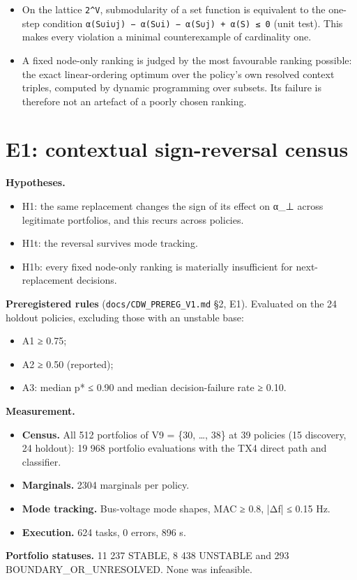 \documentclass[10pt,a4paper]{article}
\begin{document}
\begin{itemize}
\item On the lattice \texttt{2\textasciicircum{}V}, submodularity of a set function is equivalent to the one-step condition \texttt{α(S∪i∪j) − α(S∪i) − α(S∪j) + α(S) ≤ 0} (unit test). This makes every violation a minimal counterexample of cardinality one.
\item A fixed node-only ranking is judged by the most favourable ranking possible: the exact linear-ordering optimum over the policy's own resolved context triples, computed by dynamic programming over subsets. Its failure is therefore not an artefact of a poorly chosen ranking.
\end{itemize}
\section{E1: contextual sign-reversal census}
\textbf{Hypotheses.}

\begin{itemize}
\item H1: the same replacement changes the sign of its effect on α\_⊥ across legitimate portfolios, and this recurs across policies.
\item H1t: the reversal survives mode tracking.
\item H1b: every fixed node-only ranking is materially insufficient for next-replacement decisions.
\end{itemize}
\textbf{Preregistered rules} (\texttt{docs/\allowbreak{}CDW\_\allowbreak{}PREREG\_\allowbreak{}V1.md} §2, E1). Evaluated on the 24 holdout policies, excluding those with an unstable base:

\begin{itemize}
\item A1 ≥ 0.75;
\item A2 ≥ 0.50 (reported);
\item A3: median p* ≤ 0.90 and median decision-failure rate ≥ 0.10.
\end{itemize}
\textbf{Measurement.}

\begin{itemize}
\item \textbf{Census.} All 512 portfolios of V9 = \{30, …, 38\} at 39 policies (15 discovery, 24 holdout): 19 968 portfolio evaluations with the TX4 direct path and classifier.
\item \textbf{Marginals.} 2304 marginals per policy.
\item \textbf{Mode tracking.} Bus-voltage mode shapes, MAC ≥ 0.8, |Δf| ≤ 0.15 Hz.
\item \textbf{Execution.} 624 tasks, 0 errors, 896 s.
\end{itemize}
\textbf{Portfolio statuses.} 11 237 STABLE, 8 438 UNSTABLE and 293 BOUNDARY\_OR\_UNRESOLVED. None was infeasible.
\end{document}

